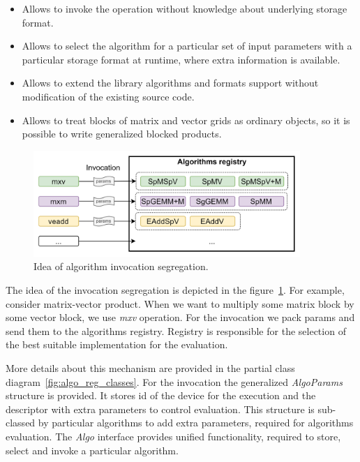 \begin{itemize}
    \item Allows to invoke the operation without knowledge about underlying storage format.
    \item Allows to select the algorithm for a particular set of input parameters with a particular storage format at runtime, where extra information is available.
    \item Allows to extend the library algorithms and formats support without modification of the existing source code.
    \item Allows to treat blocks of matrix and vector grids as ordinary objects, so it is possible to write generalized blocked products.
\end{itemize}

\begin{figure}
    \centering
    \includegraphics[width=0.9\textwidth]{images/algo_registry_idea.png}
    \caption{Idea of algorithm invocation segregation.}
    \label{fig:algo_reg_idea}
\end{figure}

The idea of the invocation segregation is depicted in the figure~\ref{fig:algo_reg_idea}. For example, consider matrix-vector product. When we want to multiply some matrix block by some vector block, we use \textit{mxv} operation. For the invocation we pack params and send them to the algorithms registry. Registry is responsible for the selection of the best suitable implementation for the evaluation.

More details about this mechanism are provided in the partial class diagram~\ref{fig:algo_reg_classes}. For the invocation the generalized \textit{AlgoParams} structure is provided. It stores id of the device for the execution and the descriptor with extra parameters to control evaluation. This structure is sub-classed by particular algorithms to add extra parameters, required for algorithms evaluation. The \textit{Algo} interface provides unified functionality, required to store, select and invoke a particular algorithm.

